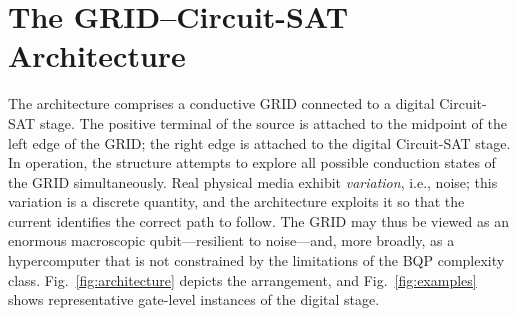 \documentclass[letterpaper,journal]{IEEEtran}
\begin{document}
\section{The GRID--Circuit-SAT Architecture}
\label{sec:arch}

The architecture comprises a conductive GRID connected to a digital
Circuit-SAT stage. The positive terminal of the source is attached to the
midpoint of the left edge of the GRID; the right edge is attached to the
digital Circuit-SAT stage. In operation, the structure attempts to explore
all possible conduction states of the GRID simultaneously. Real physical
media exhibit \emph{variation}, i.e., noise; this variation is a discrete
quantity, and the architecture exploits it so that the current identifies
the correct path to follow. The GRID may thus be viewed as an enormous
macroscopic qubit---resilient to noise---and, more broadly, as a
hypercomputer that is not constrained by the limitations of the BQP
complexity class. Fig.~\ref{fig:architecture} depicts the arrangement, and
Fig.~\ref{fig:examples} shows representative gate-level instances of the
digital stage.
\end{document}
